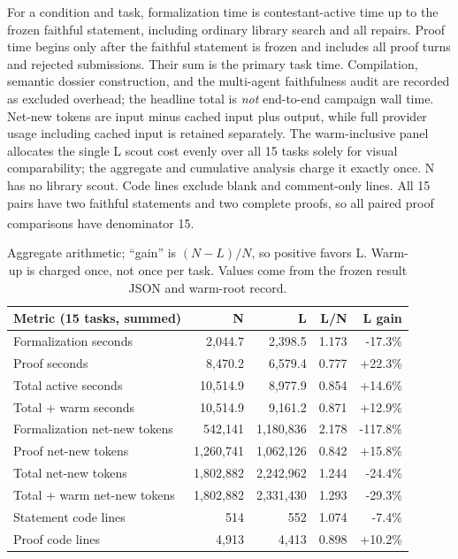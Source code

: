 \documentclass[10pt,a4paper]{article}
\newcommand{\src}[1]{\textsuperscript{\cite{#1}}}
\begin{document}
For a condition and task, formalization time is contestant-active time up to
the frozen faithful statement, including ordinary library search and all
repairs. Proof time begins only after the faithful statement is frozen and
includes all proof turns and rejected submissions. Their sum is the primary
task time. Compilation, semantic dossier construction, and the multi-agent
faithfulness audit are recorded as excluded overhead; the headline total is
\emph{not} end-to-end campaign wall time. Net-new tokens are
input minus cached input plus output, while full provider usage including
cached input is retained separately. The warm-inclusive panel allocates the
single L scout cost evenly over all 15 tasks solely for visual comparability;
the aggregate and cumulative analysis charge it exactly once. N has no
library scout. Code lines exclude blank and comment-only lines. All 15 pairs
have two faithful statements and two complete proofs, so all paired proof
comparisons have denominator 15.\src{metrics33,results35,warmroot,plotcode}

\begin{table}[ht]\centering\small
\begin{tabular}{@{}lrrrr@{}}\toprule
Metric (15 tasks, summed) & N & L & L/N & L gain\\\midrule
Formalization seconds & 2,044.7 & 2,398.5 & 1.173 & -17.3\%\\
Proof seconds & 8,470.2 & 6,579.4 & 0.777 & +22.3\%\\
Total active seconds & 10,514.9 & 8,977.9 & 0.854 & +14.6\%\\
Total + warm seconds & 10,514.9 & 9,161.2 & 0.871 & +12.9\%\\
Formalization net-new tokens & 542,141 & 1,180,836 & 2.178 & -117.8\%\\
Proof net-new tokens & 1,260,741 & 1,062,126 & 0.842 & +15.8\%\\
Total net-new tokens & 1,802,882 & 2,242,962 & 1.244 & -24.4\%\\
Total + warm net-new tokens & 1,802,882 & 2,331,430 & 1.293 & -29.3\%\\
Statement code lines & 514 & 552 & 1.074 & -7.4\%\\
Proof code lines & 4,913 & 4,413 & 0.898 & +10.2\%\\
\bottomrule\end{tabular}
\caption{Aggregate arithmetic; ``gain'' is $(N-L)/N$, so positive favors L. Warm-up is charged once, not once per task. Values come from the frozen result JSON and warm-root record.\cite{results35,warmroot,plotcode}}
\label{tab:aggregate}
\end{table}
\end{document}
